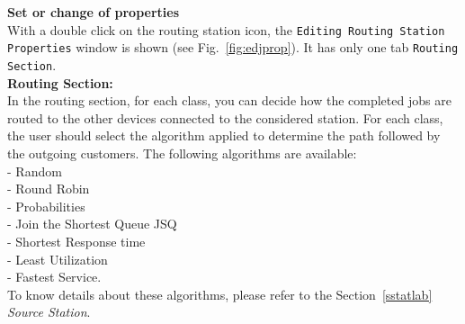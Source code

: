 \noindent \textbf{Set or change of properties}\\ With a double click on the
routing station icon, the \texttt{Editing Routing Station
Properties} window is shown (see Fig.~\ref{fig:edjprop}).
It has only one tab \texttt{Routing Section}.\\

\noindent \textbf{Routing Section:}\\ In the routing section, for
each class, you can decide how the completed jobs are routed to
the other devices connected to the considered station.
For each class, the user should select the algorithm applied to
determine the path followed by the outgoing customers.
The following algorithms are available:\\
- Random\\  - Round Robin\\ - Probabilities\\   - Join the Shortest Queue JSQ\\
- Shortest Response time\\ - Least Utilization\\  - Fastest Service.\\

\noindent To know details about these algorithms, please refer to the
Section~\ref{sstatlab} \emph{Source Station}.

